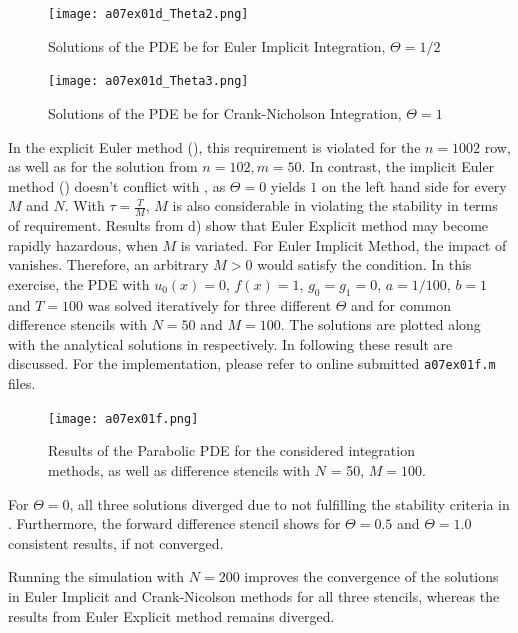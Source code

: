 \begin{figure}[H]
\vspace*{\FigUpperVSpace}
	\texttt{[image: a07ex01d\_Theta2.png]} 
	\caption{Solutions of the PDE be for Euler Implicit Integration, $\Theta = 1/2$}
	\label{fig:a07ex01d_Theta2}
\end{figure}
%
\vfill
%
\begin{figure}[H]
\vspace*{\FigUpperVSpace}
	\texttt{[image: a07ex01d\_Theta3.png]} 
	\caption{Solutions of the PDE be for Crank-Nicholson Integration, $\Theta = 1$}
	\label{fig:a07ex01d_Theta3}
\end{figure}
In the explicit Euler method (), this requirement is violated for the $n=1002$ row, as well as for the solution from $n=102, m = 50$.
In contrast, the implicit Euler method () doesn't conflict with , as $\Theta = 0$ yields $1$ on the left hand side for every $M$ and $N$.
%
With $\tau = \frac{T}{M}$, $M$ is also considerable in violating the stability in terms of  requirement.
Results from d) show that Euler Explicit method may become rapidly hazardous, when $M$ is variated.
For Euler Implicit Method, the impact of vanishes.
Therefore, an arbitrary $M>0$ would satisfy the condition.
%
In this exercise, the PDE with $u_0(x) = 0$, $f(x) = 1$, $g_0 = g_1 = 0$, $a = 1/100$, $b = 1$ and $T = 100$ was solved iteratively for three different $\Theta$ and for common difference stencils with $N = 50$ and $M=100$.
The solutions are plotted along with the analytical solutions in  respectively.
In following these result are discussed.
For the implementation, please refer to online submitted \texttt{a07ex01f.m} files.
\begin{figure}[H]
\vspace*{\FigUpperVSpace}
	\texttt{[image: a07ex01f.png]} 
	\caption{Results of the Parabolic PDE for the considered integration methods, as well as difference stencils with $N$ = 50, $M = 100$.}
	\label{fig:a07ex01f}
\end{figure}
For $\Theta = 0$, all three solutions diverged due to not fulfilling the stability criteria in .
Furthermore, the forward difference stencil shows for $\Theta = 0.5$ and $\Theta = 1.0$ consistent results, if not converged.
\par
Running the simulation with $N = 200$ improves the convergence of the solutions in Euler Implicit and Crank-Nicolson methods for all three stencils, whereas the results from Euler Explicit method remains diverged.
%
%

